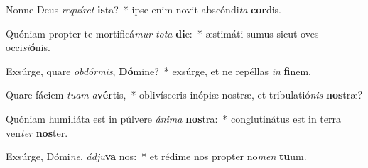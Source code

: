 \item Nonne Deus \textit{re}\textit{quí}\textit{ret} \textbf{is}ta?~* ipse enim novit abscóndi\textit{ta} \textbf{cor}dis.
\item Quóniam propter te mortificá\textit{mur} \textit{to}\textit{ta} \textbf{di}e:~* æstimáti sumus sicut oves occi\textit{si}\textbf{ó}nis.
\item Exsúrge, quare \textit{ob}\textit{dór}\textit{mis}, \textbf{Dó}mine?~* exsúrge, et ne repéllas \textit{in} \textbf{fi}nem.
\item Quare fáciem \textit{tu}\textit{am} \textit{a}\textbf{vér}tis,~* oblivísceris inópiæ nostræ, et tribulatió\textit{nis} \textbf{nos}træ?
\item Quóniam humiliáta est in púlvere \textit{á}\textit{ni}\textit{ma} \textbf{nos}tra:~* conglutinátus est in terra ven\textit{ter} \textbf{nos}ter.
\item Exsúrge, Dómi\textit{ne}, \textit{ád}\textit{ju}\textbf{va} nos:~* et rédime nos propter no\textit{men} \textbf{tu}um.
